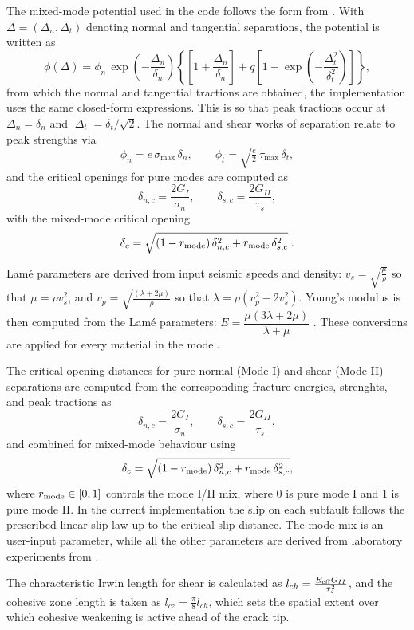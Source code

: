 \documentclass[10pt]{article}
\begin{document}
The mixed-mode potential used in the code follows the form from \cite{mahajanModelingInterfacialCrack2008}. With $\Delta=(\Delta_n,\Delta_t)$ denoting normal and tangential separations, the potential is written as
\[
\phi(\Delta)=\phi_n\,\exp\left(-\frac{\Delta_n}{\delta_n}\right)\left\{\left[1+\frac{\Delta_n}{\delta_n}\right]+q\left[1-\exp\left(-\frac{\Delta_t^2}{\delta_t^2}\right)\right]\right\},
\]
from which the normal and tangential tractions are obtained, the implementation uses the same closed-form expressions. This is so that peak tractions occur at $\Delta_n=\delta_n$ and $|\Delta_t|=\delta_t/\sqrt{2}$. The normal and shear works of separation relate to peak strengths via
\[ \phi_n = e\,\sigma_{\max}\,\delta_n, \qquad \phi_t = \sqrt{\tfrac{e}{2}}\,\tau_{\max}\,\delta_t, \]
and the critical openings for pure modes are computed as
\[ \delta_{n,c}=\frac{2G_I}{\sigma_n},\qquad \delta_{s,c}=\frac{2G_{II}}{\tau_s}, \]
with the mixed-mode critical opening
\[ \delta_c=\sqrt{(1-r_{\rm mode})\,\delta_{n,c}^2 + r_{\rm mode}\,\delta_{s,c}^2 }\;.
\]

Lamé parameters are derived from input seismic speeds and density: \(v_s=\sqrt{\frac{\mu}{\rho}}\) so that \(\mu=\rho v_s^2\), and \(v_p=\sqrt{\frac{(\lambda+2\mu)}{\rho}}\) so that \(\lambda=\rho(v_p^2-2v_s^2)\). Young's modulus is then computed from the Lamé parameters: \(E=\dfrac{\mu(3\lambda+2\mu)}{\lambda+\mu}\) \parencite{kAkiRichards19801981}. These conversions are applied for every material in the model. \par

The critical opening distances for pure normal (Mode I) and shear (Mode II) separations are computed from the corresponding fracture energies, strenghts, and peak tractions as
\[ \delta_{n,c}=\frac{2G_I}{\sigma_n},\qquad \delta_{s,c}=\frac{2G_{II}}{\tau_s}, \]
and combined for mixed-mode behaviour using
\[ \delta_c = \sqrt{(1-r_{\rm mode})\,\delta_{n,c}^2 + r_{\rm mode}\,\delta_{s,c}^2 }, \]
where \(r_{\rm mode}\in[0,1]\) controls the mode I/II mix, where 0 is pure mode I and 1 is pure mode II. In the current implementation the slip on each subfault follows the prescribed linear slip law up to the critical slip distance. The mode mix is an user-input parameter, while all the other parameters are derived from laboratory experiments from \cite{mahajanModelingInterfacialCrack2008}.  \par

The characteristic Irwin length for shear is calculated as \(l_{ch}=\frac{E_{\rm eff}G_{II}}{\tau_s^2}\), and the cohesive zone length is taken as \(l_{cz}=\tfrac{\pi}{8}l_{ch}\), which sets the spatial extent over which cohesive weakening is active ahead of the crack tip. \par
\end{document}
